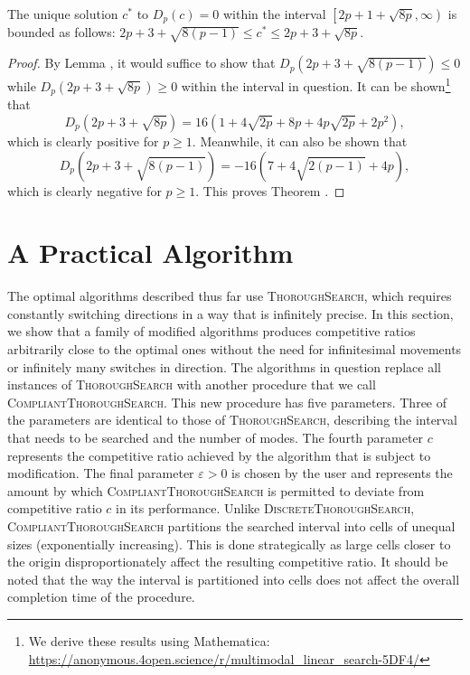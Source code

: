 \begin{theorem} 
    The unique solution $c^*$ to $D_p(c)=0$ within the interval $\left[2p+1+\sqrt{8p},\infty\right)$ is bounded as follows: $2p+3+\sqrt{8(p-1)} \leq c^* \leq 2p+3+\sqrt{8p}$.
\end{theorem}
\begin{appendixonly}
\begin{proof}
    By Lemma , it would suffice to show that $D_p\left(2p+3+\sqrt{8(p-1)}\right)\leq 0$ while $D_p\left(2p+3+\sqrt{8p}\right)\geq0$ within the interval in question. 
    It can be shown\footnote{We derive these results using Mathematica: \url{https://anonymous.4open.science/r/multimodal_linear_search-5DF4/}} that 
    $$D_p\left(2p+3+\sqrt{8p}\right) = 16\left(1+4\sqrt{2p}+8p+4p\sqrt{2p}+2p^2\right),$$ 
    which is clearly positive for $p\geq1$. Meanwhile, it can also be shown that 
    $$D_p\left(2p+3+\sqrt{8(p-1)}\right) = -16\left(7+4\sqrt{2(p-1)}+4p\right),$$
    which is clearly negative for $p\geq 1$. 
    This proves Theorem .
\end{proof}
\end{appendixonly}

\section{A Practical Algorithm}

The optimal algorithms described thus far use \textsc{ThoroughSearch}, which requires constantly switching directions in a way that is infinitely precise. In this section, we show that a family of modified algorithms produces competitive ratios arbitrarily close to the optimal ones without the need for infinitesimal movements or infinitely many switches in direction. The algorithms in question replace all instances of \textsc{ThoroughSearch} with another procedure that we call \textsc{CompliantThoroughSearch}. This new procedure has five parameters. Three of the parameters are identical to those of \textsc{ThoroughSearch}, describing the interval that needs to be searched and the number of modes. The fourth parameter $c$ represents the competitive ratio achieved by the algorithm that is subject to modification. The final parameter $\varepsilon>0$ is chosen by the user and represents the amount by which \textsc{CompliantThoroughSearch} is permitted to deviate from competitive ratio $c$ in its performance. Unlike \textsc{DiscreteThoroughSearch}, \textsc{CompliantThoroughSearch} partitions the searched interval into cells of unequal sizes (exponentially increasing). This is done strategically as large cells closer to the origin disproportionately affect the resulting competitive ratio. It should be noted that the way the interval is partitioned into cells does not affect the overall completion time of the procedure.

